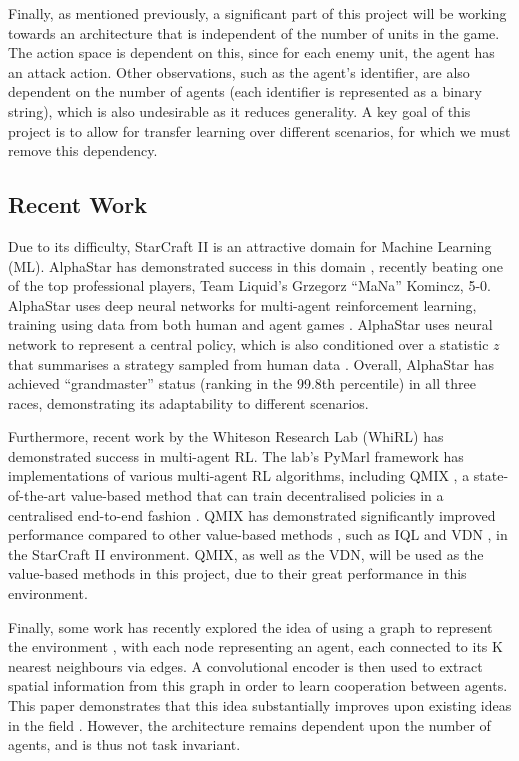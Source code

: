Finally, as mentioned previously, a significant part of this project will be working towards an architecture that is independent of the number of units in the game. The action space is dependent on this, since for each enemy unit, the agent has an attack action. Other observations, such as the agent's identifier, are also dependent on the number of agents (each identifier is represented as a binary string), which is also undesirable as it reduces generality. A key goal of this project is to allow for transfer learning over different scenarios, for which we must remove this dependency.

\subsection{Recent Work}

Due to its difficulty, StarCraft II is an attractive domain for Machine Learning (ML). AlphaStar has demonstrated success in this domain \cite{alphastar}, recently beating one of the top professional players, Team Liquid’s Grzegorz ``MaNa'' Komincz, 5-0. AlphaStar uses deep neural networks for multi-agent reinforcement learning, training using data from both human and agent games \cite{alphastar}. AlphaStar uses neural network to represent a central policy, which is also conditioned over a statistic $z$ that summarises a strategy sampled from human data \cite{alphastar}. Overall, AlphaStar has achieved ``grandmaster'' status (ranking in the 99.8th percentile) in all three races, demonstrating its adaptability to different scenarios.


Furthermore, recent work by the Whiteson Research Lab (WhiRL) has demonstrated success in multi-agent RL. The lab's PyMarl framework has implementations of various multi-agent RL algorithms, including QMIX \cite{qmixcite}, a state-of-the-art value-based method that can train decentralised policies in a centralised end-to-end fashion \cite{qmixcite}. QMIX has demonstrated significantly improved performance compared to other value-based methods \cite{qmixcite}, such as IQL \cite{IQL} and VDN \cite{vdn}, in the StarCraft II environment. QMIX, as well as the VDN, will be used as the value-based methods in this project, due to their great performance in this environment.

Finally, some work has recently explored the idea of using a graph to represent the environment \cite{graph}, with each node representing an agent, each connected to its K nearest neighbours via edges. A convolutional encoder is then used to extract spatial information from this graph in order to learn cooperation between agents. This paper demonstrates that this idea substantially improves upon existing ideas in the field \cite{graph}. However, the architecture remains dependent upon the number of agents, and is thus not task invariant.



